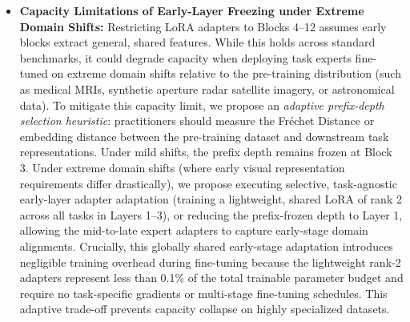 \begin{itemize}
    \item \textbf{Capacity Limitations of Early-Layer Freezing under Extreme Domain Shifts:} Restricting LoRA adapters to Blocks 4--12 assumes early blocks extract general, shared features.
While this holds across standard benchmarks, it could degrade capacity when deploying task experts fine-tuned on extreme domain shifts relative to the pre-training distribution (such as medical MRIs, synthetic aperture radar satellite imagery, or astronomical data).
To mitigate this capacity limit, we propose an \emph{adaptive prefix-depth selection heuristic}: practitioners should measure the Fr{\'e}chet Distance or embedding distance between the pre-training dataset and downstream task representations.
Under mild shifts, the prefix depth remains frozen at Block 3.
Under extreme domain shifts (where early visual representation requirements differ drastically), we propose executing selective, task-agnostic early-layer adapter adaptation (training a lightweight, shared LoRA of rank 2 across all tasks in Layers 1--3), or reducing the prefix-frozen depth to Layer 1, allowing the mid-to-late expert adapters to capture early-stage domain alignments.
Crucially, this globally shared early-stage adaptation introduces negligible training overhead during fine-tuning because the lightweight rank-2 adapters represent less than 0.1\% of the total trainable parameter budget and require no task-specific gradients or multi-stage fine-tuning schedules.
This adaptive trade-off prevents capacity collapse on highly specialized datasets.


\end{itemize}
